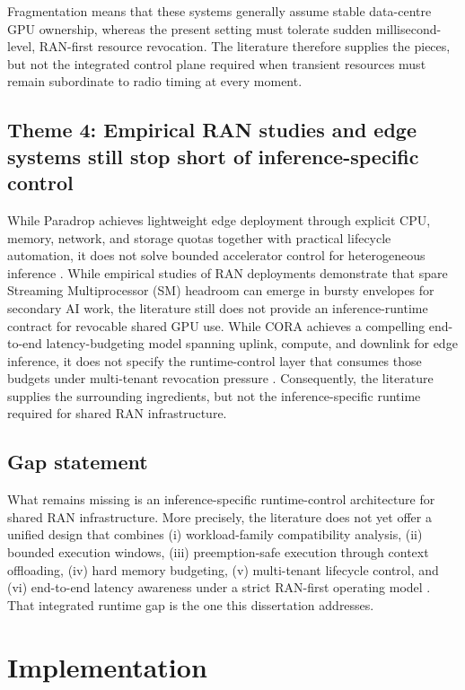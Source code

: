 \documentclass[a4paper,11pt]{article}
\begin{document}
Fragmentation means that these systems generally assume stable data-centre GPU ownership, whereas the present setting must tolerate sudden millisecond-level, RAN-first resource revocation. The literature therefore supplies the pieces, but not the integrated control plane required when transient resources must remain subordinate to radio timing at every moment.

\subsection{Theme 4: Empirical RAN studies and edge systems still stop short of inference-specific control}

While Paradrop achieves lightweight edge deployment through explicit CPU, memory, network, and storage quotas together with practical lifecycle automation, it does not solve bounded accelerator control for heterogeneous inference \cite{paradrop}. While empirical studies of RAN deployments demonstrate that spare Streaming Multiprocessor (SM) headroom can emerge in bursty envelopes for secondary AI work, the literature still does not provide an inference-runtime contract for revocable shared GPU use. While CORA achieves a compelling end-to-end latency-budgeting model spanning uplink, compute, and downlink for edge inference, it does not specify the runtime-control layer that consumes those budgets under multi-tenant revocation pressure \cite{cora}. Consequently, the literature supplies the surrounding ingredients, but not the inference-specific runtime required for shared RAN infrastructure.

\subsection{Gap statement}

What remains missing is an inference-specific runtime-control architecture for shared RAN infrastructure. More precisely, the literature does not yet offer a unified design that combines (i) workload-family compatibility analysis, (ii) bounded execution windows, (iii) preemption-safe execution through context offloading, (iv) hard memory budgeting, (v) multi-tenant lifecycle control, and (vi) end-to-end latency awareness under a strict RAN-first operating model \cite{cora,slaairan,paradrop}. That integrated runtime gap is the one this dissertation addresses.

\section{Implementation}
\end{document}
